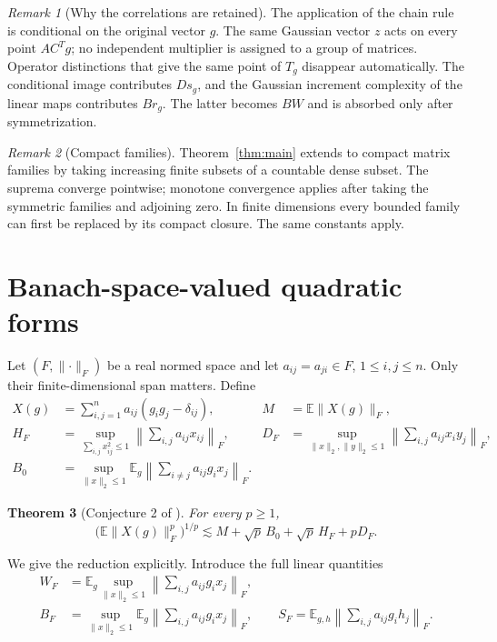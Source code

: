 \documentclass[11pt,a4paper]{article}
\numberwithin{equation}{section}
\newtheorem{theorem}{Theorem}[section]
\theoremstyle{remark}
\newtheorem{remark}[theorem]{Remark}
\newcommand{\E}{\mathbb E}
\newcommand{\norm}[1]{\lVert #1\rVert}
\begin{document}
\begin{remark}[Why the correlations are retained]
The application of the chain rule is conditional on the original vector $g$. The same Gaussian vector $z$ acts on every point $AC^Tg$; no independent multiplier is assigned to a group of matrices. Operator distinctions that give the same point of $T_g$ disappear automatically. The conditional image contributes $Ds_g$, and the Gaussian increment complexity of the linear maps contributes $Br_g$. The latter becomes $BW$ and is absorbed only after symmetrization.
\end{remark}

\begin{remark}[Compact families]
Theorem~\ref{thm:main} extends to compact matrix families by taking increasing finite subsets of a countable dense subset. The suprema converge pointwise; monotone convergence applies after taking the symmetric families and adjoining zero. In finite dimensions every bounded family can first be replaced by its compact closure. The same constants apply.
\end{remark}

\section{Banach-space-valued quadratic forms}

Let $(F,\norm{\cdot}_F)$ be a real normed space and let $a_{ij}=a_{ji}\in F$, $1\le i,j\le n$. Only their finite-dimensional span matters. Define
\begin{align*}
 X(g)&=\sum_{i,j=1}^n a_{ij}(g_i g_j-\delta_{ij}),
 &M&=\E\norm{X(g)}_F,\\
 H_F&=\sup_{\sum_{i,j}x_{ij}^2\le1}
       \left\|\sum_{i,j}a_{ij}x_{ij}\right\|_F,
 &D_F&=\sup_{\norm{x}_2,\norm{y}_2\le1}
       \left\|\sum_{i,j}a_{ij}x_i y_j\right\|_F,\\
 B_0&=\sup_{\norm{x}_2\le1}\E_g
       \left\|\sum_{i\ne j}a_{ij}g_i x_j\right\|_F.
\end{align*}

\begin{theorem}[Conjecture 2 of \cite{ALM}]\label{thm:banach}
For every $p\ge1$,
\begin{equation}
 \boxed{\quad
 \bigl(\E\norm{X(g)}_F^p\bigr)^{1/p}
 \lesssim M+\sqrt p\,B_0+\sqrt p\,H_F+pD_F.
 \quad}
 \label{eq:banach}
\end{equation}
\end{theorem}

We give the reduction explicitly. Introduce the full linear quantities
\begin{align*}
 W_F&=\E_g\sup_{\norm{x}_2\le1}
       \left\|\sum_{i,j}a_{ij}g_i x_j\right\|_F,\\
 B_F&=\sup_{\norm{x}_2\le1}\E_g
       \left\|\sum_{i,j}a_{ij}g_i x_j\right\|_F,
 \qquad
 S_F=\E_{g,h}\left\|\sum_{i,j}a_{ij}g_i h_j\right\|_F.
\end{align*}
\end{document}
